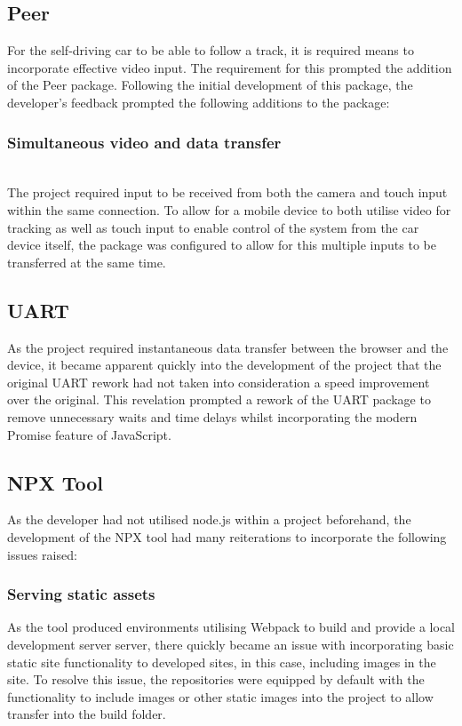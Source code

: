 \documentclass{l4proj}
\begin{document}
\subsection{Peer}
For the self-driving car to be able to follow a track, it is required means to incorporate effective video input. The requirement for this prompted the addition of the Peer package. Following the initial development of this package, the developer's feedback prompted the following additions to the package:

\subsubsection{Simultaneous video and data transfer}\hfill\\
The project required input to be received from both the camera and touch input within the same connection. To allow for a mobile device to both utilise video for tracking as well as touch input to enable control of the system from the car device itself, the package was configured to allow for this multiple inputs to be transferred at the same time.
\subsection{UART}
As the project required instantaneous data transfer between the browser and the device, it became apparent quickly into the development of the project that the original UART rework had not taken into consideration a speed improvement over the original. This revelation prompted a rework of the UART package to remove unnecessary waits and time delays whilst incorporating the modern Promise feature of JavaScript.

\subsection{NPX Tool}
As the developer had not utilised node.js within a project beforehand, the development of the NPX tool had many reiterations to incorporate the following issues raised:
\subsubsection{Serving static assets}
As the tool produced environments utilising Webpack to build and provide a local development server server, there quickly became an issue with incorporating basic static site functionality to developed sites, in this case, including images in the site. To resolve this issue, the repositories were equipped by default with the functionality to include images or other static images into the project to allow transfer into the build folder.
\end{document}
